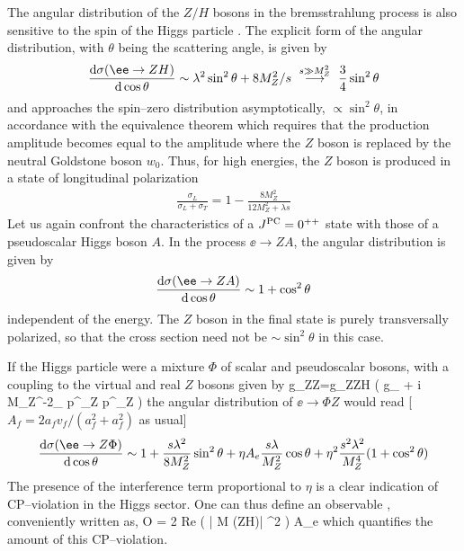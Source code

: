 The angular distribution of the $Z/H$ bosons in the bremsstrahlung process is 
also sensitive to the spin of the Higgs particle \cite{ee-HZ-ang}. The explicit
form of the angular distribution, with $\theta$ being the scattering angle, is 
given by
\begin{eqnarray}
\frac{ {\rm d}\sigma (\ee \to ZH)} { {\rm d} \cos \theta} \sim \lambda^2
\sin^2\theta +8M_Z^2/s  \ \stackrel{ s \gg M_Z^2} \longrightarrow  \ 
\frac{3}{4} \sin^2\theta
\end{eqnarray}
and approaches the spin--zero distribution asymptotically, $\propto \sin^2
\theta$, in accordance with the equivalence theorem which requires that the 
production amplitude becomes equal to the amplitude where the $Z$ boson is 
replaced by the neutral Goldstone boson $w_0$. Thus, for high energies, the $Z$ 
boson is produced in a state of longitudinal
polarization
\begin{eqnarray}
\frac{\sigma_L} {\sigma_L +\sigma_T} = 1- \frac{8M_Z^2}{12M_Z^2+\lambda s}
\end{eqnarray}
Let us again confront the characteristics of a $J^{\rm PC}=0^{++}$ state with
those of a pseudoscalar Higgs boson $A$. In the  process $\ee \to ZA$, the 
angular distribution is given by 
\begin{eqnarray}
\frac{ {\rm d}\sigma (\ee \to ZA)} { {\rm d} \cos \theta} \sim 1+ \cos^2\theta
\end{eqnarray}
independent of the energy. The $Z$ boson in the final state is purely
transversally polarized, so that the cross section need not be $\sim
\sin^2\theta$ in this case.\s

If the Higgs particle were a mixture $\Phi$ of scalar and pseudoscalar bosons, 
with a coupling to the virtual and real $Z$ bosons given by 
\beq
g_{ZZ\Phi}=g_{ZZH} \bigg( g_{\mu \nu} + i \eta M_Z^{-2}\epsilon_{\mu \nu 
\rho \sigma} p^\sigma_{Z} p^\rho_Z \bigg)
\eeq
the angular distribution of $\ee \to \Phi Z$ would read [$A_f= 2a_f 
v_f/(a_f^2+a_f^2)$ as usual]
\begin{eqnarray}
\frac{ {\rm d}\sigma (\ee \to Z\Phi)} { {\rm d} \cos \theta} \sim 1+ 
\frac{s\lambda^2}{8M_Z^2} \sin^2\theta + \eta A_e \frac{s \lambda}{M_Z^2}
\cos \theta + \eta^2 \frac{s^2\lambda^2}{M_Z^4} (1+\cos^2\theta)
\label{HZ:angular}
\end{eqnarray}
The presence of the interference term proportional to $\eta$ is a clear 
indication of CP--violation in the Higgs sector. One can thus define an
observable \cite{ee-HZ-cos}, conveniently written as, 
\beq
\langle O \rangle = 2 {\rm Re} \bigg( \frac{ {\cal M} (\ee \to ZH) 
{\cal M}^* (\ee \to ZA) } { | {\cal M} (\ee \to ZH)| ^2 } \bigg) \propto  
\eta A_e \frac{s \lambda}{M_Z^2}
\label{Oobservable}
\eeq
which quantifies the amount of this CP--violation. \s

